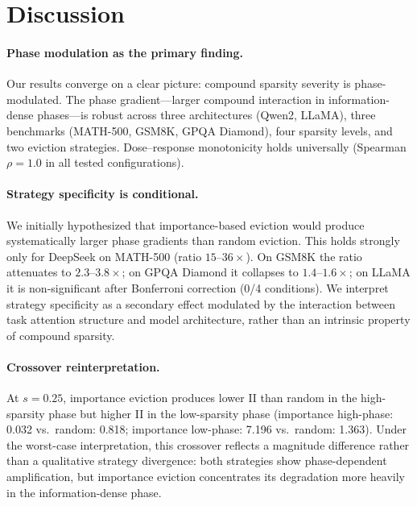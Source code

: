 \documentclass[11pt,a4paper]{article}
\begin{document}
\section{Discussion}
\label{sec:discussion}

\paragraph{Phase modulation as the primary finding.}
Our results converge on a clear picture: compound sparsity severity is phase-modulated. The phase gradient---larger compound interaction in information-dense phases---is robust across three architectures (Qwen2, LLaMA), three benchmarks (MATH-500, GSM8K, GPQA Diamond), four sparsity levels, and two eviction strategies. Dose--response monotonicity holds universally (Spearman $\rho = 1.0$ in all tested configurations).

\paragraph{Strategy specificity is conditional.}
We initially hypothesized that importance-based eviction would produce systematically larger phase gradients than random eviction. This holds strongly only for DeepSeek on MATH-500 (ratio $15$--$36\times$). On GSM8K the ratio attenuates to $2.3$--$3.8\times$; on GPQA Diamond it collapses to $1.4$--$1.6\times$; on LLaMA it is non-significant after Bonferroni correction (0/4 conditions). We interpret strategy specificity as a secondary effect modulated by the interaction between task attention structure and model architecture, rather than an intrinsic property of compound sparsity.

\paragraph{Crossover reinterpretation.}
At $s=0.25$, importance eviction produces lower II than random in the high-sparsity phase but higher II in the low-sparsity phase (importance high-phase: 0.032 vs.\ random: 0.818; importance low-phase: 7.196 vs.\ random: 1.363). Under the worst-case interpretation, this crossover reflects a magnitude difference rather than a qualitative strategy divergence: both strategies show phase-dependent amplification, but importance eviction concentrates its degradation more heavily in the information-dense phase.
\end{document}
